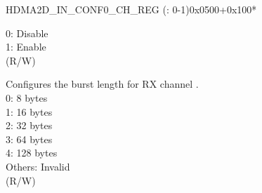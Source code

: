 \begin{register}{H}{DMA2D\_IN\_CONF0\_CH\_REG (: 0-1)}{0x0500+0x100*}
\begin{regdesc}
\begin{reglist}
0: Disable\\
1: Enable\\ (R/W)
\label{fielddesc:DMA2DINMEMBURSTLENGTHCHN}\item [DMA2D\_IN\_MEM\_BURST\_LENGTH\_CH\regindex{n}] Configures the burst length for RX channel .\\
0: 8 bytes\\
1: 16 bytes\\
2: 32 bytes\\
3: 64 bytes\\
4: 128 bytes\\
Others: Invalid\\ (R/W)

\item [Continued on the next page...]
\end{reglist}\end{regdesc}
\end{register}


